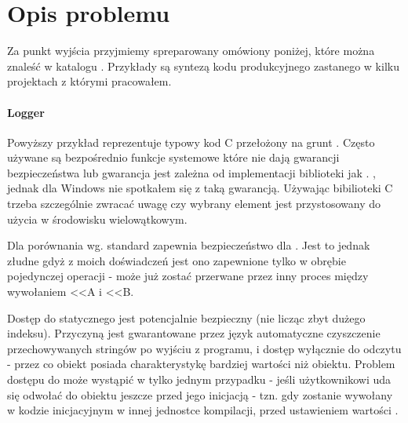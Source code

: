 \section{Opis problemu}\label{sec:problem-desc}
Za punkt wyjścia przyjmiemy spreparowany omówiony poniżej, które można znaleść w katalogu  . Przykłady są syntezą kodu produkcyjnego zastanego w kilku projektach z którymi pracowałem. 

\paragraph{Logger}
Powyższy przykład reprezentuje typowy kod C przełożony na grunt \Cpp{}. Często używane są bezpośrednio funkcje systemowe które nie dają gwarancji bezpieczeństwa lub gwarancja jest zależna od implementacji biblioteki jak . , jednak dla Windows nie spotkałem się z taką gwarancją. Używając bibilioteki C trzeba szczególnie zwracać uwagę czy wybrany element jest przystosowany do użycia w środowisku wielowątkowym.

Dla porównania wg.  standard zapewnia bezpieczeństwo dla . Jest to jednak złudne gdyż z moich doświadczeń jest ono zapewnione tylko w obrębie pojedynczej operacji -  może już zostać przerwane przez inny proces między wywołaniem <<A i <<B.

Dostęp do statycznego  jest potencjalnie bezpieczny (nie licząc zbyt dużego indeksu). Przyczyną jest gwarantowane przez język automatyczne czyszczenie przechowywanych stringów po wyjściu z programu, i dostęp wyłącznie do odczytu - przez co obiekt posiada charakterystykę bardziej wartości niż obiektu. Problem dostępu do  może wystąpić w tylko jednym przypadku - jeśli użytkownikowi uda się odwołać do obiektu jeszcze przed jego inicjacją - tzn. gdy  zostanie wywołany w kodzie inicjacyjnym w innej jednostce kompilacji, przed ustawieniem wartości .
\\
